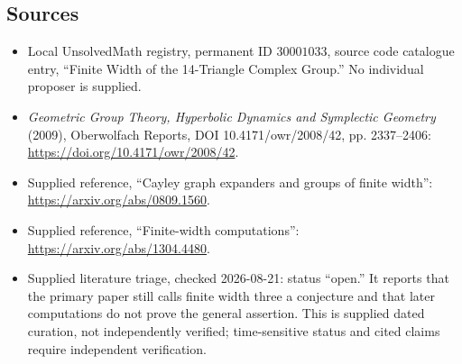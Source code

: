 \documentclass[11pt]{article}
\begin{document}
\subsection{Sources}
\begin{itemize}
\item Local UnsolvedMath registry, permanent ID \(30001033\), source code catalogue entry, ``Finite Width of the 14-Triangle Complex Group.'' No individual proposer is supplied.
\item \emph{Geometric Group Theory, Hyperbolic Dynamics and Symplectic Geometry} (2009), Oberwolfach Reports, DOI 10.4171/owr/2008/42, pp. 2337--2406: \url{https://doi.org/10.4171/owr/2008/42}.
\item Supplied reference, ``Cayley graph expanders and groups of finite width'': \url{https://arxiv.org/abs/0809.1560}.
\item Supplied reference, ``Finite-width computations'': \url{https://arxiv.org/abs/1304.4480}.
\item Supplied literature triage, checked 2026-08-21: status ``open.'' It reports that the primary paper still calls finite width three a conjecture and that later computations do not prove the general assertion. This is supplied dated curation, not independently verified; time-sensitive status and cited claims require independent verification.
\end{itemize}
\end{document}

